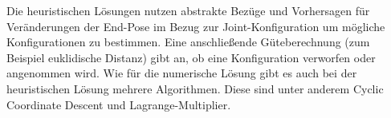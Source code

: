 Die heuristischen Lösungen nutzen abstrakte Bezüge und Vorhersagen für Veränderungen der End-Pose im Bezug zur Joint-Konfiguration um mögliche Konfigurationen zu bestimmen. Eine anschließende Güteberechnung (zum Beispiel euklidische Distanz) gibt an, ob eine Konfiguration verworfen oder angenommen wird. Wie für die numerische Lösung gibt es auch bei der heuristischen Lösung mehrere Algorithmen. Diese sind unter anderem Cyclic Coordinate Descent und Lagrange-Multiplier.\cite{danielasteidl2011}

